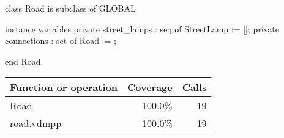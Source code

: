 \documentclass[a4paper]{article}
\begin{document}
\title{}
\author{}
\begin{vdm_al}
class Road is subclass of GLOBAL

instance variables
    private street_lamps : seq of StreetLamp := [];
    private connections : set of Road := {};

end Road
\end{vdm_al}
\bigskip
\begin{longtable}{|l|r|r|}
\hline
Function or operation & Coverage & Calls \\
\hline
\hline
Road & 100.0\% & 19 \\
\hline
\hline
road.vdmpp & 100.0\% & 19 \\
\hline
\end{longtable}
\end{document}
